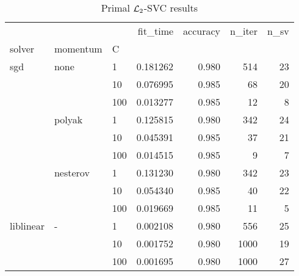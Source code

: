 \begin{table}[H]
\centering
\caption{Primal $\protect \mathcal{L}_2$-SVC results}
\label{primal_l2_svc_cv_results}
\begin{tabular}{lllrrrr}
\toprule
          &   &     &  fit\_time &  accuracy &  n\_iter &  n\_sv \\
solver & momentum & C &           &           &         &       \\
\midrule
sgd & none & 1   &  0.181262 &     0.980 &     514 &    23 \\
          &   & 10  &  0.076995 &     0.985 &      68 &    20 \\
          &   & 100 &  0.013277 &     0.985 &      12 &     8 \\
          & polyak & 1   &  0.125815 &     0.980 &     342 &    24 \\
          &   & 10  &  0.045391 &     0.985 &      37 &    21 \\
          &   & 100 &  0.014515 &     0.985 &       9 &     7 \\
          & nesterov & 1   &  0.131230 &     0.980 &     342 &    23 \\
          &   & 10  &  0.054340 &     0.985 &      40 &    22 \\
          &   & 100 &  0.019669 &     0.985 &      11 &     5 \\
liblinear & - & 1   &  0.002108 &     0.980 &     556 &    25 \\
          &   & 10  &  0.001752 &     0.980 &    1000 &    19 \\
          &   & 100 &  0.001695 &     0.980 &    1000 &    27 \\
\bottomrule
\end{tabular}
\end{table}
